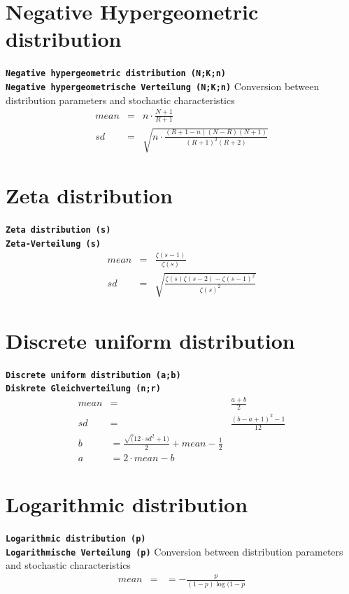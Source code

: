 \documentclass{svmono}
\def\cm#1{\textbf{\texttt{#1}}}
\begin{document}
\section*{Negative Hypergeometric distribution}
\cm{Negative hypergeometric distribution (N;K;n)}~\\
\cm{Negative hypergeometrische Verteilung (N;K;n)}
Conversion between distribution parameters and stochastic characteristics
\begin{eqnarray*}
mean&=&n\cdot\frac{N+1}{R+1}\\
sd&=&\sqrt{n\cdot\frac{(R+1-n)(N-R)(N+1)}{(R+1)^2(R+2)}}
\end{eqnarray*}





\section*{Zeta distribution}
\cm{Zeta distribution (s)}~\\
\cm{Zeta-Verteilung (s)}
\begin{eqnarray*}
mean&=&\frac{\zeta(s-1)}{\zeta(s)}\\
sd&=&\sqrt{\frac{\zeta(s)\zeta(s-2)-\zeta(s-1)^2}{\zeta(s)^2}}
\end{eqnarray*}





\section*{Discrete uniform distribution}
\cm{Discrete uniform distribution (a;b)}~\\
\cm{Diskrete Gleichverteilung (n;r)}
\begin{eqnarray*}
mean&=&\frac{a+b}{2}\\
sd&=&\frac{(b-a+1)^2-1}{12}\\
b&=\frac{\sqrt(12\cdot sd^2+1)}{2}+mean-\frac{1}{2}\\
a&=2\cdot mean-b&
\end{eqnarray*}





\section*{Logarithmic distribution}
\cm{Logarithmic distribution (p)}~\\
\cm{Logarithmische Verteilung (p)}
Conversion between distribution parameters and stochastic characteristics
\begin{eqnarray*}
mean&=&=-\frac{p}{(1-p)\log(1-p}
\end{eqnarray*}
\end{document}
